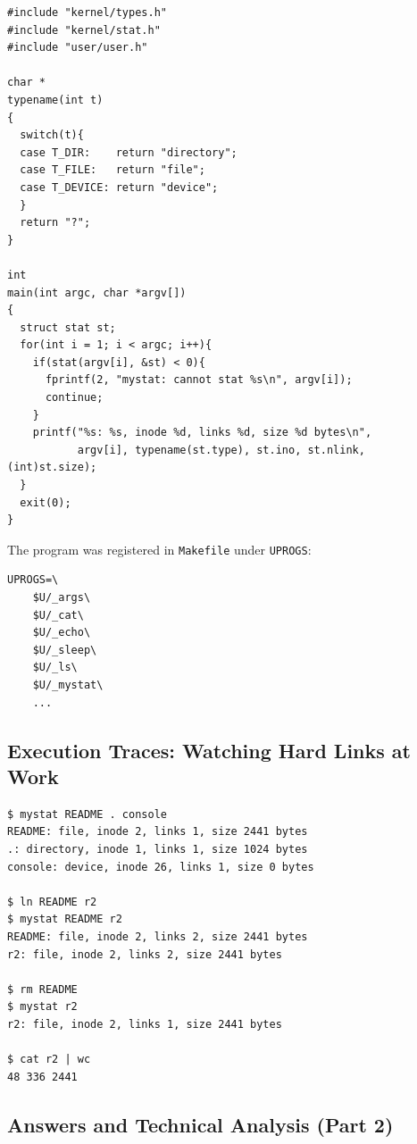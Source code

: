 \documentclass[12pt,a4paper]{article}
\begin{document}
\begin{lstlisting}[style=cstyle]
#include "kernel/types.h"
#include "kernel/stat.h"
#include "user/user.h"

char *
typename(int t)
{
  switch(t){
  case T_DIR:    return "directory";
  case T_FILE:   return "file";
  case T_DEVICE: return "device";
  }
  return "?";
}

int
main(int argc, char *argv[])
{
  struct stat st;
  for(int i = 1; i < argc; i++){
    if(stat(argv[i], &st) < 0){
      fprintf(2, "mystat: cannot stat %s\n", argv[i]);
      continue;
    }
    printf("%s: %s, inode %d, links %d, size %d bytes\n",
           argv[i], typename(st.type), st.ino, st.nlink, (int)st.size);
  }
  exit(0);
}
\end{lstlisting}

The program was registered in \texttt{Makefile} under \texttt{UPROGS}:
\begin{lstlisting}[style=bashstyle]
UPROGS=\
    $U/_args\
    $U/_cat\
    $U/_echo\
    $U/_sleep\
    $U/_ls\
    $U/_mystat\
    ...
\end{lstlisting}

\subsection{Execution Traces: Watching Hard Links at Work}
\begin{lstlisting}[style=consolestyle]
$ mystat README . console
README: file, inode 2, links 1, size 2441 bytes
.: directory, inode 1, links 1, size 1024 bytes
console: device, inode 26, links 1, size 0 bytes

$ ln README r2
$ mystat README r2
README: file, inode 2, links 2, size 2441 bytes
r2: file, inode 2, links 2, size 2441 bytes

$ rm README
$ mystat r2
r2: file, inode 2, links 1, size 2441 bytes

$ cat r2 | wc
48 336 2441
\end{lstlisting}

\subsection{Answers and Technical Analysis (Part 2)}
\end{document}

